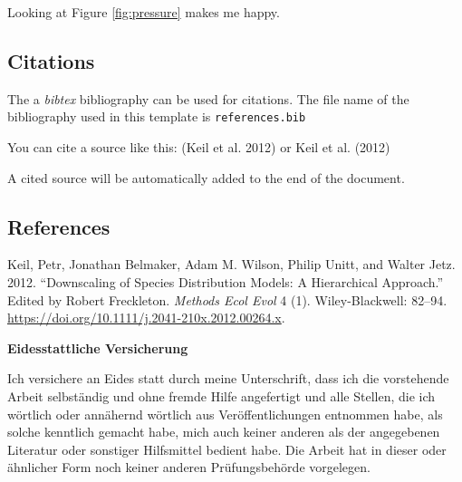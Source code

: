 \documentclass[11pt,]{article}
\begin{document}
Looking at Figure \ref{fig:pressure} makes me happy.

\hypertarget{citations}{%
\subsection{Citations}\label{citations}}

The a \emph{bibtex} bibliography can be used for citations. The file
name of the bibliography used in this template is
\texttt{references.bib}

You can cite a source like this: (Keil et al. 2012) or Keil et al.
(2012)

A cited source will be automatically added to the end of the document.

\pagebreak

\hypertarget{references}{%
\subsection*{References}\label{references}}

\hypertarget{refs}{}
\leavevmode\hypertarget{ref-Keil_2012}{}%
Keil, Petr, Jonathan Belmaker, Adam M. Wilson, Philip Unitt, and Walter
Jetz. 2012. ``Downscaling of Species Distribution Models: A Hierarchical
Approach.'' Edited by Robert Freckleton. \emph{Methods Ecol Evol} 4 (1).
Wiley-Blackwell: 82--94.
\url{https://doi.org/10.1111/j.2041-210x.2012.00264.x}.

\newpage
\textbf{Eidesstattliche Versicherung}

\bigskip

Ich versichere an Eides statt durch meine Unterschrift, dass ich die vorstehende Arbeit selbständig und ohne fremde Hilfe angefertigt und alle Stellen, die ich wörtlich oder annähernd wörtlich aus Veröffentlichungen entnommen habe, als solche kenntlich gemacht habe, mich auch keiner anderen als der angegebenen Literatur oder sonstiger Hilfsmittel bedient habe. Die Arbeit hat in dieser oder ähnlicher Form noch keiner anderen Prüfungsbehörde vorgelegen.

\vspace{1cm}
\rule{0pt}{2\baselineskip} %
\par\noindent{} \hfill\makebox[2.25in]{\hrulefill}%
\par\noindent\makebox[2.25in][l]{} \hfill{}%
\end{document}
